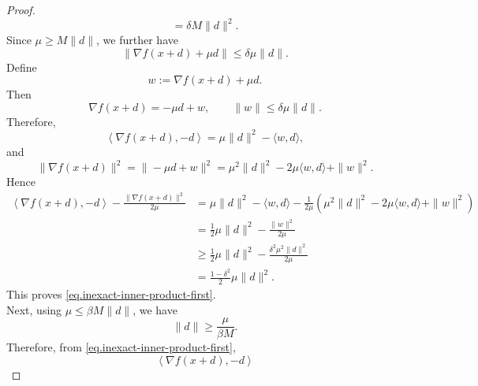 \begin{itemize}
{\begin{proof}
\[                      =
                      \delta M\|d\|^2.
                  \]
                  Since \(\mu\ge M\|d\|\), we further have
                  \[
                      \|\nabla f(x+d)+\mu d\|
                      \le
                      \delta \mu\|d\|.
                  \]
                  Define
                  \[
                      w:=\nabla f(x+d)+\mu d.
                  \]
                  Then
                  \[
                      \nabla f(x+d)=-\mu d+w,
                      \qquad
                      \|w\|\le \delta\mu\|d\|.
                  \]
                  Therefore,
                  \[
                      \left\langle \nabla f(x+d),-d\right\rangle
                      =
                      \mu\|d\|^2-\langle w,d\rangle,
                  \]
                  and
                  \[
                      \|\nabla f(x+d)\|^2
                      =
                      \|-\mu d+w\|^2
                      =
                      \mu^2\|d\|^2-2\mu\langle w,d\rangle+\|w\|^2.
                  \]
                  Hence
                  \begin{align*}
                      \left\langle \nabla f(x+d),-d\right\rangle
                      -
                      \frac{\|\nabla f(x+d)\|^2}{2\mu}
                       & =
                      \mu\|d\|^2-\langle w,d\rangle
                      -
                      \frac{1}{2\mu}
                      \left(
                      \mu^2\|d\|^2-2\mu\langle w,d\rangle+\|w\|^2
                      \right)                                \\
                       & =
                      \frac12\mu\|d\|^2-\frac{\|w\|^2}{2\mu} \\
                       & \ge
                      \frac12\mu\|d\|^2
                      -
                      \frac{\delta^2\mu^2\|d\|^2}{2\mu}      \\
                       & =
                      \frac{1-\delta^2}{2}\mu\|d\|^2.
                  \end{align*}
                  This proves \eqref{eq.inexact-inner-product-first}.\\
                  Next, using \(\mu\le \beta M\|d\|\), we have
                  \[
                      \|d\|
                      \ge
                      \frac{\mu}{\beta M}.
                  \]
                  Therefore, from \eqref{eq.inexact-inner-product-first},
                  \[
                      \left\langle \nabla f(x+d),-d\right\rangle
\]
\end{proof}}
\end{itemize}
